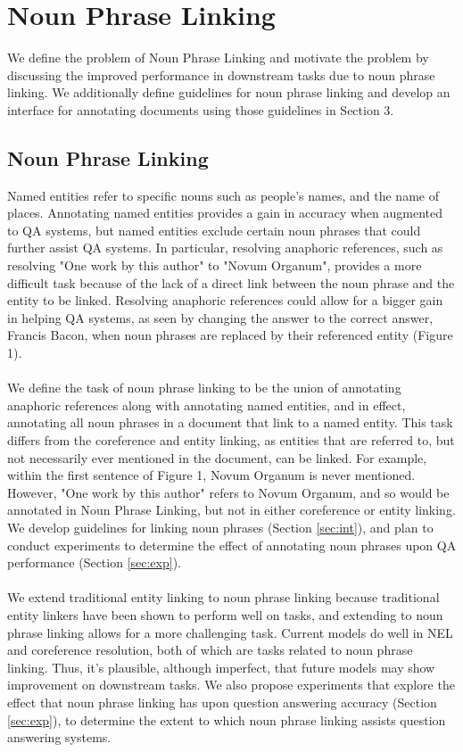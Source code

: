 \section{Noun Phrase Linking}
\label{sec:gen}
We define the problem of Noun Phrase Linking and motivate the problem by discussing the improved performance in downstream tasks due to noun phrase linking. 
We additionally define guidelines for noun phrase linking and develop an interface for annotating documents using those guidelines in Section 3. 

\subsection{Noun Phrase Linking}
Named entities refer to specific nouns such as people's names, and the name of places. 
Annotating named entities provides a gain in accuracy when augmented to QA systems, but named entities exclude certain noun phrases that could further assist QA systems. 
In particular, resolving anaphoric references, such as resolving "One work by this author" to "Novum Organum", provides a more difficult task because of the lack of a direct link between the noun phrase and the entity to be linked. 
Resolving anaphoric references could allow for a bigger gain in helping QA systems, as seen by changing the answer to the correct answer, Francis Bacon, when noun phrases are replaced by their referenced entity (Figure 1).  
\\
\\
We define the task of noun phrase linking to be the union of annotating anaphoric references along with annotating named entities, and in effect, annotating all noun phrases in a document that link to a named entity.
This task differs from the coreference and entity linking, as entities that are referred to, but not necessarily ever mentioned in the document, can be linked. 
For example, within the first sentence of Figure 1, Novum Organum is never mentioned. 
However, "One work by this author" refers to Novum Organum, and so would be annotated in Noun Phrase Linking, but not in either coreference or entity linking.  
We develop guidelines for linking noun phrases (Section \ref{sec:int}), and plan to conduct experiments to determine the effect of annotating noun phrases upon QA performance (Section \ref{sec:exp}). 
\\
\\
We extend traditional entity linking to noun phrase linking because traditional entity linkers have been shown to perform well on \nel{} tasks, and extending to noun phrase linking allows for a more challenging task. 
Current models do well in NEL and coreference resolution, both of which are tasks related to noun phrase linking. 
Thus, it's plausible, although imperfect, that future models may show improvement on downstream tasks. 
We also propose experiments that explore the effect that noun phrase linking has upon question answering accuracy (Section \ref{sec:exp}), to determine the extent to which noun phrase linking assists question answering systems. 
 

